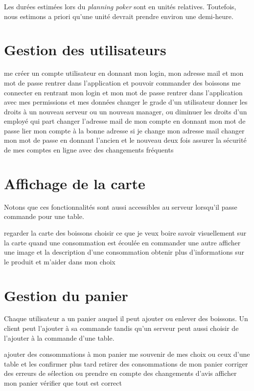 \documentclass[a4paper,10pt]{article}
\begin{document}

Les durées estimées lors du \emph{planning poker} sont en unités relatives.
Toutefois, nous estimons a priori qu'une unité devrait prendre environ une demi-heure.

\section{Gestion des utilisateurs}

{me créer un compte utilisateur en donnant mon login, mon adresse mail et mon mot de passe}
{rentrer dans l'application et pouvoir commander des boissons}
{me connecter en rentrant mon login et mon mot de passe}
{rentrer dans l'application avec mes permissions et mes données}
{changer le grade d'un utilisateur}
{donner les droits à un nouveau serveur ou un nouveau manager, ou diminuer les droits d'un employé qui part}
{changer l'adresse mail de mon compte en donnant mon mot de passe}
{lier mon compte à la bonne adresse si je change mon adresse mail}
{changer mon mot de passe en donnant l'ancien et le nouveau deux fois}
{assurer la sécurité de mes comptes en ligne avec des changements fréquents}

\section{Affichage de la carte}

Notons que ces fonctionnalités sont aussi accessibles au serveur lorsqu'il passe commande pour une table.

{regarder la carte des boissons}
{choisir ce que je veux boire}
{savoir visuellement sur la carte quand une consommation est écoulée}
{en commander une autre}
{afficher une image et la description d'une consommation}
{obtenir plus d'informations sur le produit et m'aider dans mon choix}

\section{Gestion du panier}

Chaque utilisateur a un panier auquel il peut ajouter ou enlever des boissons.
Un client peut l'ajouter à sa commande tandis qu'un serveur peut aussi choisir de l'ajouter à la commande d'une table.

{ajouter des consommations à mon panier}
{me souvenir de mes choix ou ceux d'une table et les confirmer plus tard}
{retirer des consommations de mon panier}
{corriger des erreurs de sélection ou prendre en compte des changements d'avis}
{afficher mon panier}
{vérifier que tout est correct}
\end{document}
